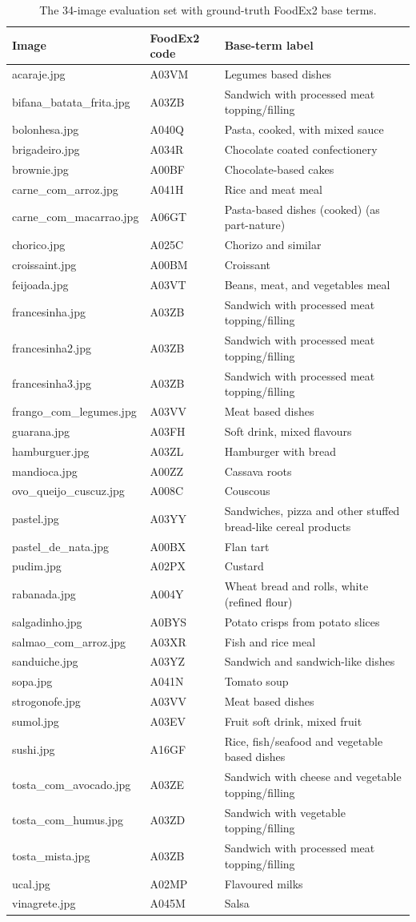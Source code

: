 \begin{longtable}[]{@{}lll@{}}
\caption{The 34-image evaluation set with ground-truth FoodEx2 base terms.}\label{tab:eval-set}\\
\toprule
\textbf{Image} & \textbf{FoodEx2 code} & \textbf{Base-term label}\tabularnewline
\midrule
\endhead
acaraje.jpg & A03VM & Legumes based dishes\tabularnewline
bifana\_batata\_frita.jpg & A03ZB & Sandwich with processed meat topping/filling\tabularnewline
bolonhesa.jpg & A040Q & Pasta, cooked, with mixed sauce\tabularnewline
brigadeiro.jpg & A034R & Chocolate coated confectionery\tabularnewline
brownie.jpg & A00BF & Chocolate-based cakes\tabularnewline
carne\_com\_arroz.jpg & A041H & Rice and meat meal\tabularnewline
carne\_com\_macarrao.jpg & A06GT & Pasta-based dishes (cooked) (as part-nature)\tabularnewline
chorico.jpg & A025C & Chorizo and similar\tabularnewline
croissaint.jpg & A00BM & Croissant\tabularnewline
feijoada.jpg & A03VT & Beans, meat, and vegetables meal\tabularnewline
francesinha.jpg & A03ZB & Sandwich with processed meat topping/filling\tabularnewline
francesinha2.jpg & A03ZB & Sandwich with processed meat topping/filling\tabularnewline
francesinha3.jpg & A03ZB & Sandwich with processed meat topping/filling\tabularnewline
frango\_com\_legumes.jpg & A03VV & Meat based dishes\tabularnewline
guarana.jpg & A03FH & Soft drink, mixed flavours\tabularnewline
hamburguer.jpg & A03ZL & Hamburger with bread\tabularnewline
mandioca.jpg & A00ZZ & Cassava roots\tabularnewline
ovo\_queijo\_cuscuz.jpg & A008C & Couscous\tabularnewline
pastel.jpg & A03YY & Sandwiches, pizza and other stuffed bread-like cereal products\tabularnewline
pastel\_de\_nata.jpg & A00BX & Flan tart\tabularnewline
pudim.jpg & A02PX & Custard\tabularnewline
rabanada.jpg & A004Y & Wheat bread and rolls, white (refined flour)\tabularnewline
salgadinho.jpg & A0BYS & Potato crisps from potato slices\tabularnewline
salmao\_com\_arroz.jpg & A03XR & Fish and rice meal\tabularnewline
sanduiche.jpg & A03YZ & Sandwich and sandwich-like dishes\tabularnewline
sopa.jpg & A041N & Tomato soup\tabularnewline
strogonofe.jpg & A03VV & Meat based dishes\tabularnewline
sumol.jpg & A03EV & Fruit soft drink, mixed fruit\tabularnewline
sushi.jpg & A16GF & Rice, fish/seafood and vegetable based dishes\tabularnewline
tosta\_com\_avocado.jpg & A03ZE & Sandwich with cheese and vegetable topping/filling\tabularnewline
tosta\_com\_humus.jpg & A03ZD & Sandwich with vegetable topping/filling\tabularnewline
tosta\_mista.jpg & A03ZB & Sandwich with processed meat topping/filling\tabularnewline
ucal.jpg & A02MP & Flavoured milks\tabularnewline
vinagrete.jpg & A045M & Salsa\tabularnewline
\bottomrule
\end{longtable}

